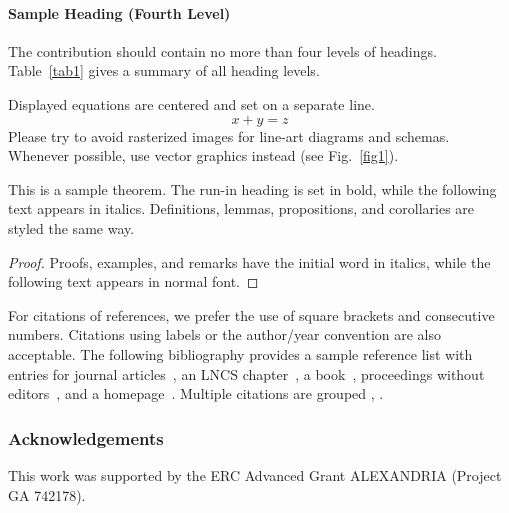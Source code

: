 \documentclass[runningheads]{llncs}
\begin{document}
\paragraph{Sample Heading (Fourth Level)}
The contribution should contain no more than four levels of
headings. Table~\ref{tab1} gives a summary of all heading levels.



\noindent Displayed equations are centered and set on a separate
line.
\begin{equation}
x + y = z
\end{equation}
Please try to avoid rasterized images for line-art diagrams and
schemas. Whenever possible, use vector graphics instead (see
Fig.~\ref{fig1}).


\begin{theorem}
This is a sample theorem. The run-in heading is set in bold, while
the following text appears in italics. Definitions, lemmas,
propositions, and corollaries are styled the same way.
\end{theorem}
%
%
\begin{proof}
Proofs, examples, and remarks have the initial word in italics,
while the following text appears in normal font.
\end{proof}
For citations of references, we prefer the use of square brackets
and consecutive numbers. Citations using labels or the author/year
convention are also acceptable. The following bibliography provides
a sample reference list with entries for journal
articles~\cite{ref_article1}, an LNCS chapter~\cite{ref_lncs1}, a
book~\cite{ref_book1}, proceedings without editors~\cite{ref_proc1},
and a homepage~\cite{ref_url1}. Multiple citations are grouped
\cite{ref_article1,ref_lncs1,ref_book1},
\cite{ref_article1,ref_book1,ref_proc1,ref_url1}.

\subsubsection{Acknowledgements} 
This work was supported by the ERC Advanced Grant ALEXANDRIA (Project GA 742178). 



\end{document}
